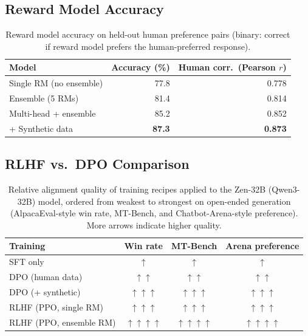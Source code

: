 \documentclass[11pt,a4paper]{article}
\begin{document}
\subsection{Reward Model Accuracy}

\begin{table}[H]
\centering
\caption{Reward model accuracy on held-out human preference pairs (binary: correct
if reward model prefers the human-preferred response).}
\begin{tabular}{lrr}
\toprule
\textbf{Model} & \textbf{Accuracy (\%)} & \textbf{Human corr.\ (Pearson $r$)} \\
\midrule
Single RM (no ensemble)    & 77.8 & 0.778 \\
Ensemble (5 RMs)           & 81.4 & 0.814 \\
Multi-head + ensemble      & 85.2 & 0.852 \\
+ Synthetic data           & \textbf{87.3} & \textbf{0.873} \\
\bottomrule
\end{tabular}
\label{tab:rm_accuracy}
\end{table}

\subsection{RLHF vs.\ DPO Comparison}

\begin{table}[H]
\centering
\caption{Relative alignment quality of training recipes applied to the Zen-32B
(Qwen3-32B) model, ordered from weakest to strongest on open-ended generation
(AlpacaEval-style win rate, MT-Bench, and Chatbot-Arena-style preference). More
arrows indicate higher quality.}
\begin{tabular}{lccc}
\toprule
\textbf{Training} & \textbf{Win rate} & \textbf{MT-Bench} & \textbf{Arena preference} \\
\midrule
SFT only                & $\uparrow$    & $\uparrow$    & $\uparrow$ \\
DPO (human data)        & $\uparrow\uparrow$   & $\uparrow\uparrow$   & $\uparrow\uparrow$ \\
DPO (+ synthetic)       & $\uparrow\uparrow\uparrow$  & $\uparrow\uparrow\uparrow$  & $\uparrow\uparrow\uparrow$ \\
RLHF (PPO, single RM)   & $\uparrow\uparrow\uparrow$  & $\uparrow\uparrow\uparrow$  & $\uparrow\uparrow\uparrow$ \\
RLHF (PPO, ensemble RM) & $\uparrow\uparrow\uparrow\uparrow$ & $\uparrow\uparrow\uparrow\uparrow$ & $\uparrow\uparrow\uparrow\uparrow$ \\
\bottomrule
\end{tabular}
\label{tab:alignment}
\end{table}
\end{document}
